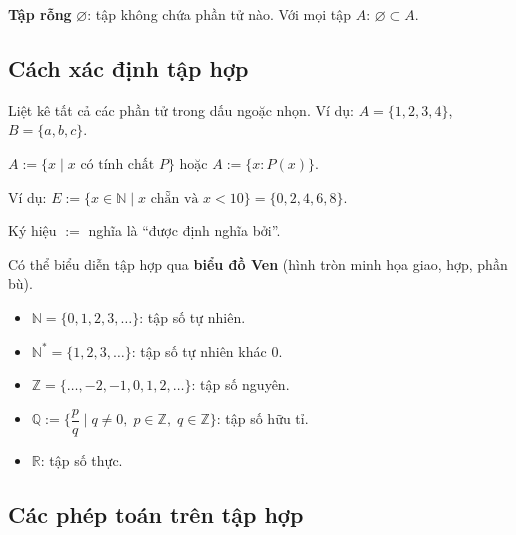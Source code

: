 \documentclass[12pt,a4paper]{article}
\begin{document}
\begin{dinhnghia}
  \textbf{Tập rỗng} $\varnothing$: tập không chứa phần tử nào. Với mọi tập $A$: $\varnothing \subset A$.
\end{dinhnghia}

\subsection{Cách xác định tập hợp}

\begin{phuongphap}[title={Liệt kê}]
  Liệt kê tất cả các phần tử trong dấu ngoặc nhọn. Ví dụ: $A = \{1, 2, 3, 4\}$, $B = \{a, b, c\}$.
\end{phuongphap}

\begin{phuongphap}[title={Chỉ ra tính chất đặc trưng}]
  $A := \{x \mid x \text{ có tính chất } P\}$ hoặc $A := \{x : P(x)\}$.
  
  Ví dụ: $E := \{x \in \mathbb{N} \mid x \text{ chẵn và } x < 10\} = \{0, 2, 4, 6, 8\}$.
\end{phuongphap}

\begin{luuy}
  Ký hiệu $:=$ nghĩa là ``được định nghĩa bởi''.
  
  Có thể biểu diễn tập hợp qua \textbf{biểu đồ Ven} (hình tròn minh họa giao, hợp, phần bù).
\end{luuy}

\begin{vidu}
  \begin{itemize}
    \item $\mathbb{N} = \{0, 1, 2, 3, \ldots\}$: tập số tự nhiên.
    \item $\mathbb{N}^* = \{1, 2, 3, \ldots\}$: tập số tự nhiên khác $0$.
    \item $\mathbb{Z} = \{\ldots, -2, -1, 0, 1, 2, \ldots\}$: tập số nguyên.
    \item $\mathbb{Q} := \{\dfrac{p}{q} \mid q \ne 0,\; p \in \mathbb{Z},\; q \in \mathbb{Z}\}$: tập số hữu tỉ.
    \item $\mathbb{R}$: tập số thực.
  \end{itemize}
\end{vidu}

\subsection{Các phép toán trên tập hợp}
\end{document}
